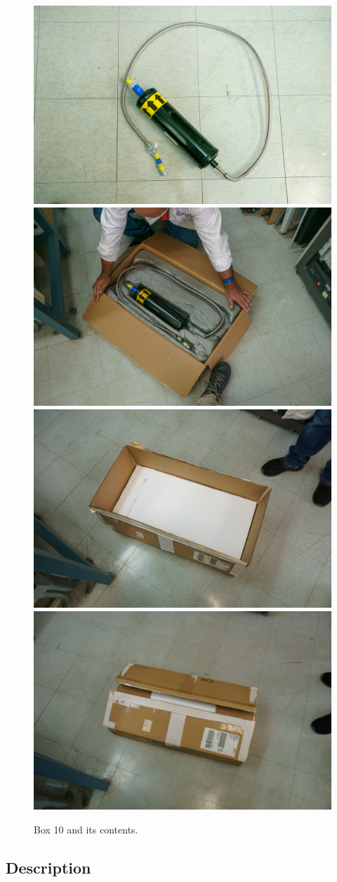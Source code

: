 \documentclass{article}
\begin{document}
\begin{figure}[bp]
\begin{center}
\includegraphics[width=0.45\linewidth]{figures/20201209T123146.jpg}
\includegraphics[width=0.45\linewidth]{figures/20201209T123225.jpg}\\[\smallskipamount]
\includegraphics[width=0.45\linewidth]{figures/20201209T123910.jpg}
\includegraphics[width=0.45\linewidth]{figures/20201209T123946.jpg}\\[\smallskipamount]
\end{center}
\caption{Box 10 and its contents.}
\label{figure:box-ten}
\end{figure}

\subsection{Description}
\end{document}
